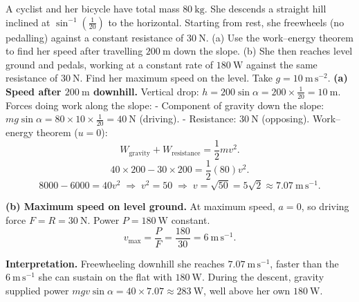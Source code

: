 \documentclass[11pt]{article}
\begin{document}
\begin{exoresolu}
A cyclist and her bicycle have total mass $80\ \mathrm{kg}$. She descends a straight hill inclined at $\sin^{-1}\!\left(\frac{1}{20}\right)$ to the horizontal. Starting from rest, she freewheels (no pedalling) against a constant resistance of $30\ \mathrm{N}$. (a) Use the work–energy theorem to find her speed after travelling $200\ \mathrm{m}$ down the slope. (b) She then reaches level ground and pedals, working at a constant rate of $180\ \mathrm{W}$ against the same resistance of $30\ \mathrm{N}$. Find her maximum speed on the level. Take $g = 10\ \mathrm{m\,s^{-2}}$.
\tcblower
\textbf{(a) Speed after $200\ \mathrm{m}$ downhill.}
Vertical drop: $h = 200\sin\alpha = 200 \times \frac{1}{20} = 10\ \mathrm{m}$.
Forces doing work along the slope:
- Component of gravity down the slope: $mg\sin\alpha = 80 \times 10 \times \frac{1}{20} = 40\ \mathrm{N}$ (driving).
- Resistance: $30\ \mathrm{N}$ (opposing).
Work–energy theorem ($u=0$):
\[
W_{\text{gravity}} + W_{\text{resistance}} = \frac{1}{2}mv^2.
\]
\[
40 \times 200 - 30 \times 200 = \frac{1}{2}(80)v^2.
\]
\[
8000 - 6000 = 40v^2 \;\Longrightarrow\; v^2 = 50 \;\Longrightarrow\; v = \sqrt{50} = 5\sqrt{2} \approx 7.07\ \mathrm{m\,s^{-1}}.
\]

\textbf{(b) Maximum speed on level ground.}
At maximum speed, $a=0$, so driving force $F = R = 30\ \mathrm{N}$.
Power $P = 180\ \mathrm{W}$ constant.
\[
v_{\max} = \frac{P}{F} = \frac{180}{30} = 6\ \mathrm{m\,s^{-1}}.
\]

\textbf{Interpretation.} Freewheeling downhill she reaches $7.07\ \mathrm{m\,s^{-1}}$, faster than the $6\ \mathrm{m\,s^{-1}}$ she can sustain on the flat with $180\ \mathrm{W}$. During the descent, gravity supplied power $mgv\sin\alpha = 40 \times 7.07 \approx 283\ \mathrm{W}$, well above her own $180\ \mathrm{W}$.
\end{exoresolu}
\end{document}

